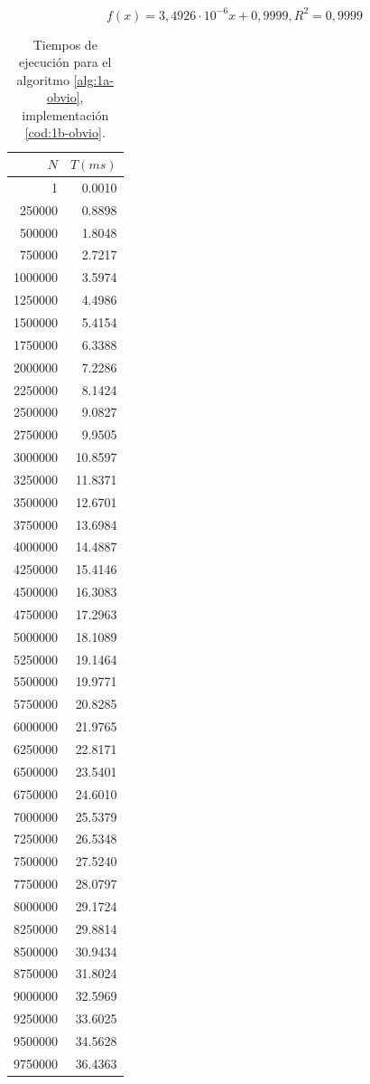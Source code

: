 \begin{equation}
    \boxed{f(x) = 3,4926 \cdot 10 ^{-6} x + 0,9999, R^2 = 0,9999}
    \label{eq:1b-obvio-regresion}
\end{equation}

\begin{table}
	\footnotesize
	\centering
	\begin{tabular}{|r|r|}
        \hline
        $N$ & $T (ms)$ \\
        \hline
		1 & 0.0010 \\ 
		250000 & 0.8898 \\ 
		500000 & 1.8048 \\ 
		750000 & 2.7217 \\ 
		1000000 & 3.5974 \\ 
		1250000 & 4.4986 \\ 
		1500000 & 5.4154 \\ 
		1750000 & 6.3388 \\ 
		2000000 & 7.2286 \\ 
		2250000 & 8.1424 \\ 
		2500000 & 9.0827 \\ 
		2750000 & 9.9505 \\ 
		3000000 & 10.8597 \\ 
		3250000 & 11.8371 \\ 
		3500000 & 12.6701 \\ 
		3750000 & 13.6984 \\ 
		4000000 & 14.4887 \\ 
		4250000 & 15.4146 \\ 
		4500000 & 16.3083 \\ 
		4750000 & 17.2963 \\ 
		5000000 & 18.1089 \\ 
		5250000 & 19.1464 \\ 
		5500000 & 19.9771 \\ 
		5750000 & 20.8285 \\ 
		6000000 & 21.9765 \\ 
		6250000 & 22.8171 \\ 
		6500000 & 23.5401 \\ 
		6750000 & 24.6010 \\ 
		7000000 & 25.5379 \\ 
		7250000 & 26.5348 \\ 
		7500000 & 27.5240 \\ 
		7750000 & 28.0797 \\ 
		8000000 & 29.1724 \\ 
		8250000 & 29.8814 \\ 
		8500000 & 30.9434 \\ 
		8750000 & 31.8024 \\ 
		9000000 & 32.5969 \\ 
		9250000 & 33.6025 \\ 
		9500000 & 34.5628 \\ 
		9750000 & 36.4363 \\ 
        \hline
	\end{tabular}

    \caption{Tiempos de ejecución para el algoritmo \ref{alg:1a-obvio}, implementación \ref{cod:1b-obvio}.}
    \label{tab:1b-obvio}
\end{table}

